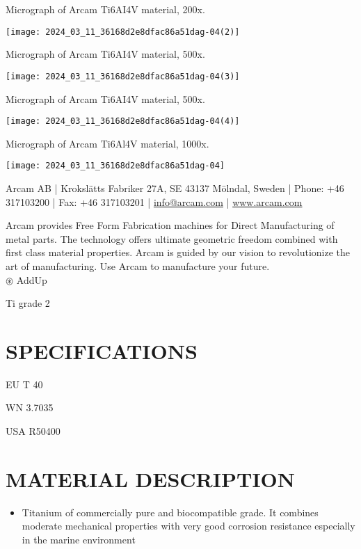\documentclass[10pt]{article}
\begin{document}
Micrograph of Arcam Ti6AI4V material, 200x.

\begin{center}
\texttt{[image: 2024\_03\_11\_36168d2e8dfac86a51dag-04(2)]}
\end{center}

Micrograph of Arcam Ti6AI4V material, 500x.

\begin{center}
\texttt{[image: 2024\_03\_11\_36168d2e8dfac86a51dag-04(3)]}
\end{center}

Micrograph of Arcam Ti6AI4V material, 500x.

\begin{center}
\texttt{[image: 2024\_03\_11\_36168d2e8dfac86a51dag-04(4)]}
\end{center}

Micrograph of Arcam Ti6Al4V material, 1000x.

\begin{center}
\texttt{[image: 2024\_03\_11\_36168d2e8dfac86a51dag-04]}
\end{center}

Arcam AB | Krokslätts Fabriker 27A, SE 43137 Mölndal, Sweden | Phone: +46 317103200 | Fax: +46 317103201 | \href{mailto:info@arcam.com}{info@arcam.com} | \href{http://www.arcam.com}{www.arcam.com}

Arcam provides Free Form Fabrication machines for Direct Manufacturing of metal parts. The technology offers ultimate geometric freedom combined with first class material properties. Arcam is guided by our vision to revolutionize the art of manufacturing. Use Arcam to manufacture your future.\\
$\circledast$ AddUp

Ti grade 2

\section*{SPECIFICATIONS}
EU T 40

WN 3.7035

USA R50400

\section*{MATERIAL DESCRIPTION}
\begin{itemize}
  \item Titanium of commercially pure and biocompatible grade. It combines moderate mechanical properties with very good corrosion resistance especially in the marine environment
\end{itemize}
\end{document}
